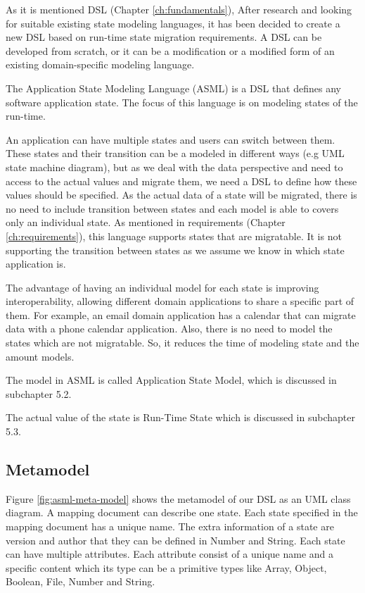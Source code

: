 As it is mentioned DSL (Chapter \ref{ch:fundamentals}), After research and looking for suitable existing state modeling languages, it has been decided to create a new DSL based on run-time state migration requirements.
A DSL can be developed from scratch, or it can be a modification or a modified form of an existing domain-specific modeling language.

The Application State Modeling Language (ASML) is a DSL that defines any software application state.
The focus of this language is on modeling states of the run-time.

An application can have multiple states and users can switch between them.
These states and their transition can be a modeled in different ways (e.g UML state machine diagram), but as we deal with the data perspective and need to access to the actual values and migrate them, we need a DSL to define how these values should be specified. As the actual data of a state will be migrated, there is no need to include transition between states and each model is able to covers only an individual state. As mentioned in requirements (Chapter \ref{ch:requirements}), this language supports states that are migratable.
It is not supporting the transition between states as we assume we know in which state application is. 

The advantage of having an individual model for each state is improving interoperability, allowing different domain applications to share a specific part of them.
For example, an email domain application has a calendar that can migrate data with a phone calendar application.
Also, there is no need to model the states which are not migratable. So, it reduces the time of modeling state and the amount models. 

The model in ASML is called Application State Model, which is discussed in subchapter 5.2.

The actual value of the state is Run-Time State which is discussed in subchapter 5.3.
\subsection{Metamodel}

Figure \ref{fig:asml-meta-model} shows the metamodel of our DSL as an UML class diagram. A mapping document can describe one state. Each state  specified in the mapping document has a unique name. The extra information of a state are version and author that they can be defined in Number and String. Each state can have multiple attributes. Each attribute consist of a unique name and a specific content which its type can be a primitive types like Array, Object, Boolean, File, Number and String.

